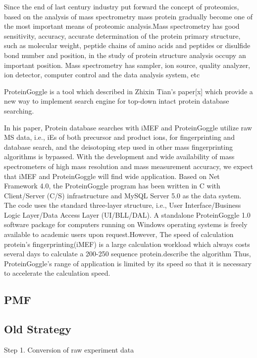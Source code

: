 \documentclass[letterpaper,twocolumn,10pt]{article}
\begin{document}
Since the end of last century industry put forward the concept of proteomics, based on the analysis of mass spectrometry mass protein gradually become one of the most important means of proteomic analysis.Mass spectrometry has good sensitivity, accuracy, accurate determination of the protein primary structure, such as molecular weight, peptide chains of amino acids and peptides or disulfide bond number and position, in the study of protein structure analysis occupy an important position. Mass spectrometry has sampler, ion source, quality analyzer, ion detector, computer control and the data analysis system, etc

ProteinGoggle is a tool which described in Zhixin Tian's paper[x] which provide a new way to implement search engine for top-down intact protein database searching. 

In his paper, Protein database searches with iMEF and ProteinGoggle utilize raw MS data, i.e., iEs of both precursor and product ions, for fingerprinting and database search, and the deisotoping step used in other mass fingerprinting algorithms is bypassed. With the development and wide availability of mass spectrometers of high mass resolution and mass measurement accuracy, we expect that iMEF and ProteinGoggle will find wide application.
Based on Net Framework 4.0, the ProteinGoggle program has been written in C with Client/Server (C/S) infrastructure and MySQL Server 5.0 as the data system. The code uses the standard three-layer structure, i.e., User Interface/Business Logic Layer/Data Access Layer (UI/BLL/DAL). A standalone ProteinGoggle 1.0 software package for computers running on Windows operating systems is freely available to academic users upon request.However, The speed of calculation protein's fingerprinting(iMEF) is a large calculation workload which always costs several days to calculate a 200-250 sequence protein.describe the algorithm Thus, ProteinGoggle's range of application is limited by its speed so that it is necessary to accelerate the calculation speed.

\subsection{PMF}


\subsection{Old Strategy}

Step 1. Conversion of raw experiment data
\end{document}
